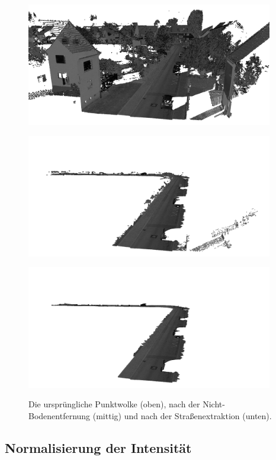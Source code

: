 \begin{figure}
    {\includegraphics[width=0.96\textwidth]{graphics/eval_street_extr_full}}
    \par\smallskip
    {\includegraphics[width=0.96\textwidth]{graphics/eval_street_extr_ground}}
    \par\smallskip
    {\includegraphics[width=0.96\textwidth]{graphics/eval_street_extr_final}}
    \caption{Die ursprüngliche Punktwolke (oben), nach der Nicht-Bodenentfernung (mittig) und nach der Straßenextraktion (unten).}
    \label{fig:street_extraction}
\end{figure}

\subsection*{Normalisierung der Intensität}

